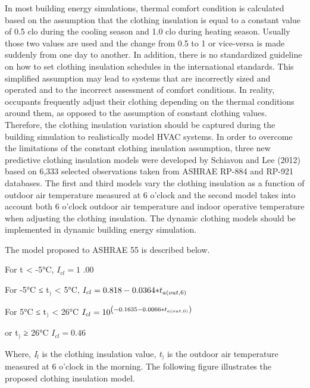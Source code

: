 In most building energy simulations, thermal comfort condition is calculated based on the assumption that the clothing insulation is equal to a constant value of 0.5 clo during the cooling season and 1.0 clo during heating season. Usually those two values are used and the change from 0.5 to 1 or vice-versa is made suddenly from one day to another. In addition, there is no standardized guideline on how to set clothing insulation schedules in the international standards. This simplified assumption may lead to systems that are incorrectly sized and operated and to the incorrect assessment of comfort conditions. In reality, occupants frequently adjust their clothing depending on the thermal conditions around them, as opposed to the assumption of constant clothing values. Therefore, the clothing insulation variation should be captured during the building simulation to realistically model HVAC systems. In order to overcome the limitations of the constant clothing insulation assumption, three new predictive clothing insulation models were developed by Schiavon and Lee (2012) based on 6,333 selected observations taken from ASHRAE RP-884 and RP-921 databases. The first and third models vary the clothing insulation as a function of outdoor air temperature measured at 6 o'clock and the second model takes into account both 6 o'clock outdoor air temperature and indoor operative temperature when adjusting the clothing insulation. The dynamic clothing models should be implemented in dynamic building energy simulation.

The model proposed to ASHRAE 55 is described below.

For t\(_{ }\) \textless{} -5°C, \({I_{cl}} = 1\) .00

For -5°C ≤ t\(_{)}\) \textless{} 5°C, \({I_{cl}} = 0.818 - 0.0364{\rm{*}}{t_{a\left( {out,6} \right)}}\)

For 5°C ≤ t\(_{)}\) \textless{} 26°C \({I_{cl}} = {10^{\left( { - 0.1635 - 0.0066{\rm{*}}{t_{a\left( {out,6} \right)}}} \right)}}\)

or t\(_{)}\) ≥ 26°C \({I_{cl}} = 0.46\)

Where, \emph{I\(_{l}\)} is the clothing insulation value, \emph{t\(_{)}\)} is the outdoor air temperature measured at 6 o'clock in the morning. The following figure illustrates the proposed clothing insulation model.

